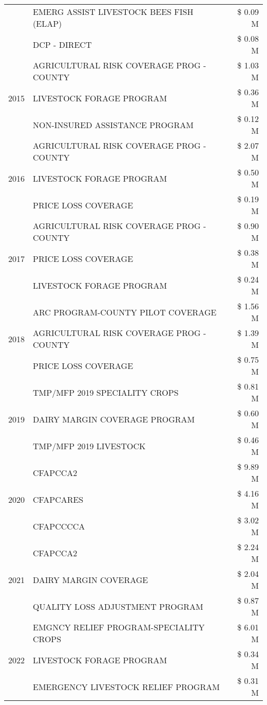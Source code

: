 \begin{tabular}{llr}
 & EMERG ASSIST LIVESTOCK BEES FISH (ELAP) & \$ 0.09 M \\
 & DCP - DIRECT & \$ 0.08 M \\
\cline{1-3}
\multirow[t]{3}{*}{2015} & AGRICULTURAL RISK COVERAGE PROG - COUNTY & \$ 1.03 M \\
 & LIVESTOCK FORAGE PROGRAM & \$ 0.36 M \\
 & NON-INSURED ASSISTANCE PROGRAM & \$ 0.12 M \\
\cline{1-3}
\multirow[t]{3}{*}{2016} & AGRICULTURAL RISK COVERAGE PROG - COUNTY & \$ 2.07 M \\
 & LIVESTOCK FORAGE PROGRAM & \$ 0.50 M \\
 & PRICE LOSS COVERAGE & \$ 0.19 M \\
\cline{1-3}
\multirow[t]{3}{*}{2017} & AGRICULTURAL RISK COVERAGE PROG - COUNTY & \$ 0.90 M \\
 & PRICE LOSS COVERAGE & \$ 0.38 M \\
 & LIVESTOCK FORAGE PROGRAM & \$ 0.24 M \\
\cline{1-3}
\multirow[t]{3}{*}{2018} & ARC PROGRAM-COUNTY PILOT COVERAGE & \$ 1.56 M \\
 & AGRICULTURAL RISK COVERAGE PROG - COUNTY & \$ 1.39 M \\
 & PRICE LOSS COVERAGE & \$ 0.75 M \\
\cline{1-3}
\multirow[t]{3}{*}{2019} & TMP/MFP 2019 SPECIALITY CROPS & \$ 0.81 M \\
 & DAIRY MARGIN COVERAGE PROGRAM & \$ 0.60 M \\
 & TMP/MFP 2019 LIVESTOCK & \$ 0.46 M \\
\cline{1-3}
\multirow[t]{3}{*}{2020} & CFAPCCA2 & \$ 9.89 M \\
 & CFAPCARES & \$ 4.16 M \\
 & CFAPCCCCA & \$ 3.02 M \\
\cline{1-3}
\multirow[t]{3}{*}{2021} & CFAPCCA2 & \$ 2.24 M \\
 & DAIRY MARGIN COVERAGE & \$ 2.04 M \\
 & QUALITY LOSS ADJUSTMENT PROGRAM & \$ 0.87 M \\
\cline{1-3}
\multirow[t]{3}{*}{2022} & EMGNCY RELIEF PROGRAM-SPECIALITY CROPS & \$ 6.01 M \\
 & LIVESTOCK FORAGE PROGRAM & \$ 0.34 M \\
 & EMERGENCY LIVESTOCK RELIEF PROGRAM & \$ 0.31 M \\
\cline{1-3}
\bottomrule
\end{tabular}
